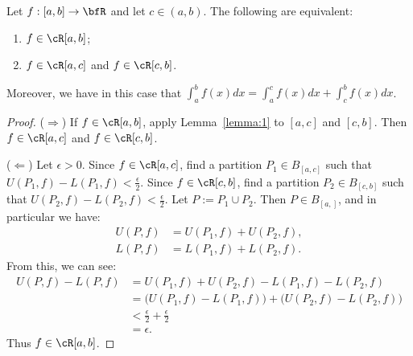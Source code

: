\documentclass[10pt,twoside,openany]{memoir}
\begin{document}
    \begin{theorem}
        Let $f:[a,b] \rightarrow \bfR$ and let $c \in (a,b)$. The following are equivalent:
            \begin{enumerate}[label = (\arabic*),itemsep=1pt,topsep=3pt]
                \item $f \in \cR[a,b]$;
                \item $f \in \cR[a,c]$ and $f \in \cR[c,b]$.
            \end{enumerate}
        Moreover, we have in this case that $\int_a^b f(x)dx = \int_a^c f(x)dx + \int_c^b f(x)dx$.
    \end{theorem}
        \begin{proof}
            ($\Rightarrow$) If $f \in \cR[a,b]$, apply Lemma~\ref{lemma:1} to $[a,c]$ and $[c,b]$. Then $f \in \cR[a,c]$ and $f \in \cR[c,b]$.

            ($\Leftarrow$) Let $\epsilon > 0$. Since $f \in \cR[a,c]$, find a partition $P_1 \in B_{[a,c]}$ such that $U(P_1,f) - L(P_1,f) < \frac{\epsilon}{2}$. Since $f \in \cR[c,b]$, find a partition $P_2 \in B_{[c,b]}$ such that $U(P_2,f) - L(P_2,f) < \frac{\epsilon}{2}$. Let $P := P_1 \cup P_2$. Then $P \in B_{[a,]}$, and in particular we have:
                \begin{equation*}
                \begin{split}
                    U(P,f) &= U(P_1,f) + U(P_2,f), \\
                    L(P,f) &= L(P_1,f) + L(P_2,f).
                \end{split}
                \end{equation*}
            From this, we can see:
                \begin{equation*}
                \begin{split}
                    U(P,f) - L(P,f)
                    & = U(P_1,f) + U(P_2,f) -L(P_1,f) - L(P_2,f) \\
                    & = \bigl(U(P_1,f) -L(P_1,f) \bigr) + \bigl(U(P_2,f) -L(P_2,f) \bigr) \\
                    & < \frac{\epsilon}{2}  + \frac{\epsilon}{2} \\
                    & = \epsilon.
                \end{split}
                \end{equation*}
            Thus $f \in \cR[a,b]$.


\end{proof}
\end{document}
